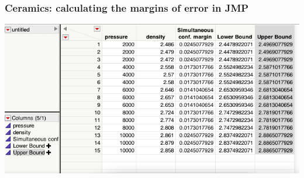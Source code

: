 \documentclass[handout]{beamer}\usepackage[]{graphicx}\usepackage[]{color}
\numberwithin{equation}{section}
\begin{document}
\begin{frame}
\frametitle{Ceramics: calculating the margins of error in JMP}
 \includegraphics{../../fig/simuljmp22.png}
\end{frame}
\end{document}
